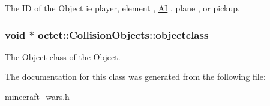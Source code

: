 The I\+D of the Object ie player, element , \hyperlink{structoctet_1_1_a_i}{A\+I} , plane , or pickup. 

\hypertarget{classoctet_1_1_collision_objects_ae36b5dcd8ca63d46a02a87b7464d11ba}{
\subsubsection[{objectclass}]{\setlength{\rightskip}{0pt plus 5cm}void $\ast$ octet\+::\+Collision\+Objects\+::objectclass\hspace{0.3cm}{\ttfamily [private]}}}\label{classoctet_1_1_collision_objects_ae36b5dcd8ca63d46a02a87b7464d11ba}


The Object class of the Object. 



The documentation for this class was generated from the following file\+:\begin{DoxyCompactItemize}
\item 
\hyperlink{minecraft__wars_8h}{minecraft\+\_\+wars.\+h}\end{DoxyCompactItemize}
